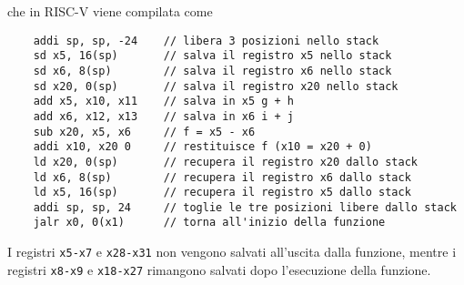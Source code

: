 \documentclass[a4paper,12pt]{article}
\theoremstyle{break}
\newcommand{\code}[1]{\texttt{#1}}
\numberwithin{equation}{section}
\begin{document}
che in RISC-V viene compilata come
\begin{verbatim}
    addi sp, sp, -24    // libera 3 posizioni nello stack
    sd x5, 16(sp)       // salva il registro x5 nello stack
    sd x6, 8(sp)        // salva il registro x6 nello stack
    sd x20, 0(sp)       // salva il registro x20 nello stack
    add x5, x10, x11    // salva in x5 g + h
    add x6, x12, x13    // salva in x6 i + j
    sub x20, x5, x6     // f = x5 - x6 
    addi x10, x20 0     // restituisce f (x10 = x20 + 0)
    ld x20, 0(sp)       // recupera il registro x20 dallo stack
    ld x6, 8(sp)        // recupera il registro x6 dallo stack
    ld x5, 16(sp)       // recupera il registro x5 dallo stack
    addi sp, sp, 24     // toglie le tre posizioni libere dallo stack
    jalr x0, 0(x1)      // torna all'inizio della funzione
\end{verbatim}
I registri \code{x5-x7} e \code{x28-x31} non vengono salvati all'uscita dalla funzione, mentre i registri \code{x8-x9} e \code{x18-x27} rimangono salvati dopo l'esecuzione della funzione.
\end{document}
